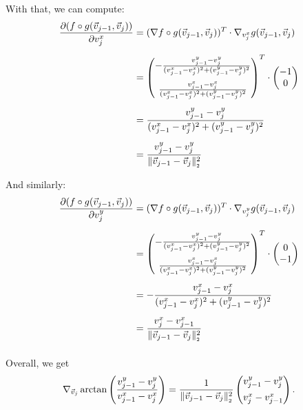 \begin{proposition}
\begin{center}
	\end{center}

	With that, we can compute:
	\begin{align*}
		\frac{\partial (f \circ g (\vec{v}_{j-1}, \vec{v}_j))}{\partial v_j^{x}} &= (\nabla f \circ g (\vec{v}_{j-1}, \vec{v}_j))^T \cdot \nabla_{v_j^{x}} g (\vec{v}_{j-1}, \vec{v}_j) \\[0.5em]
		&= \begin{pmatrix}
			- \frac{v_{j-1}^{y} - v_{j}^{y}}{(v_{j-1}^{x} - v_{j}^{x})^2 + (v_{j-1}^{y} - v_{j}^{y})^2} \\[1.0em]
			\frac{v_{j-1}^{x} - v_{j}^{x}}{(v_{j-1}^{x} - v_{j}^{x})^2 + (v_{j-1}^{y} - v_{j}^{y})^2}
		\end{pmatrix}^T
		\cdot 
		\begin{pmatrix}
			-1 \\
			0
		\end{pmatrix} \\[0.5em]
		&= \frac{v_{j-1}^{y} - v_{j}^{y}}{(v_{j-1}^{x} - v_{j}^{x})^2 + (v_{j-1}^{y} - v_{j}^{y})^2} \\[0.5em]
		&= \frac{v_{j-1}^{y} - v_{j}^{y}}{\norm[\vec{v}_{j-1} - \vec{v}_j]^2}
	\end{align*}

	And similarly:
	\begin{align*}
		\frac{\partial (f \circ g (\vec{v}_{j-1}, \vec{v}_j))}{\partial v_j^{y}} &= (\nabla f \circ g (\vec{v}_{j-1}, \vec{v}_j))^T \cdot \nabla_{v_j^{y}} g (\vec{v}_{j-1}, \vec{v}_j) \\[0.5em]
		&= \begin{pmatrix}
			- \frac{v_{j-1}^{y} - v_{j}^{y}}{(v_{j-1}^{x} - v_{j}^{x})^2 + (v_{j-1}^{y} - v_{j}^{y})^2} \\[1.0em]
			\frac{v_{j-1}^{x} - v_{j}^{x}}{(v_{j-1}^{x} - v_{j}^{x})^2 + (v_{j-1}^{y} - v_{j}^{y})^2}
		\end{pmatrix}^T
		\cdot 
		\begin{pmatrix}
			0 \\
			-1
		\end{pmatrix} \\[0.5em]
		&= - \frac{v_{j-1}^{x} - v_{j}^{x}}{(v_{j-1}^{x} - v_{j}^{x})^2 + (v_{j-1}^{y} - v_{j}^{y})^2} \\[0.5em]
		&= \frac{v_{j}^{x} - v_{j-1}^{x}}{\norm[\vec{v}_{j-1} - \vec{v}_j]^2} \\[0.5em]
	\end{align*}

	Overall, we get 
	\begin{align*}
		\nabla_{\vec{v}_j} \arctan \left(\frac{v_{j-1}^{y} - v_{j}^{y}}{v_{j-1}^{x} - v_{j}^{x}} \right) = \frac{1}{\norm[\vec{v}_{j-1} - \vec{v}_j]^2} \begin{pmatrix}
			v_{j-1}^{y} - v_{j}^{y} \\[0.5em]
			v_{j}^{x} - v_{j-1}^{x}
		\end{pmatrix}.
	\end{align*}
	

\end{proposition}
